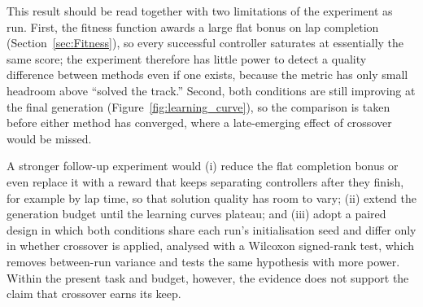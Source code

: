 \documentclass[a4paper, twocolumn]{article}
\begin{document}
This result should be read together with two limitations of the experiment as run.
First, the fitness function awards a large flat bonus on lap completion
(Section~\ref{sec:Fitness}), so every successful controller saturates at essentially the same
score; the experiment therefore has little power to detect a quality difference between methods
even if one exists, because the metric has only small headroom above ``solved the track.''
Second, both conditions are still improving at the final generation (Figure~\ref{fig:learning_curve}),
so the comparison is taken before either method has converged, where a late-emerging effect
of crossover would be missed.

A stronger follow-up experiment would (i) reduce the flat completion bonus or even replace it with a
reward that keeps separating controllers after they finish, for example by lap time, so that solution
quality has room to vary; (ii) extend the generation budget until the learning curves plateau;
and (iii) adopt a paired design in which both conditions share each run's initialisation seed
and differ only in whether crossover is applied, analysed with a Wilcoxon signed-rank test,
which removes between-run variance and tests the same hypothesis with more power.
Within the present task and budget, however, the evidence does not support the claim that
crossover earns its keep.

\printbibliography
\end{document}
